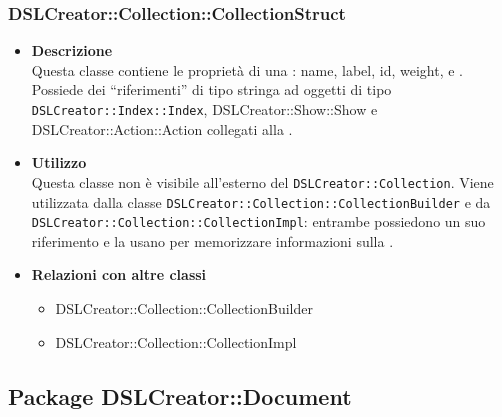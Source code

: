  \subsubsection{DSLCreator::Collection::CollectionStruct}
                    \begin{itemize}
                        \item \textbf{Descrizione} \hfill \\
                            Questa classe contiene le proprietà di una : name, label, id, weight,  e . Possiede dei ``riferimenti'' di tipo stringa ad oggetti di tipo \texttt{DSLCreator::Index::Index}, {DSLCreator::Show::Show} e {DSLCreator::Action::Action} collegati alla .
                        \item \textbf{Utilizzo} \hfill \\
                            Questa classe non è visibile all'esterno del  \texttt{DSLCreator::Collection}. Viene utilizzata dalla classe \texttt{DSLCreator::Collection::CollectionBuilder} e da \texttt{DSLCreator::Collection::CollectionImpl}: entrambe possiedono un suo riferimento e la usano per memorizzare informazioni sulla . 
                        \item \textbf{Relazioni con altre classi}
                            \begin{itemize}
                              \item DSLCreator::Collection::CollectionBuilder
                              \item DSLCreator::Collection::CollectionImpl
                            \end{itemize}
                    \end{itemize}

\subsection{Package DSLCreator::Document}

